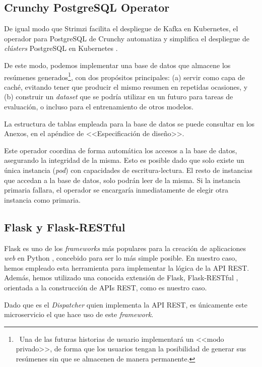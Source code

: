 \subsection{Crunchy PostgreSQL Operator}

De igual modo que Strimzi facilita el despliegue de Kafka en Kubernetes, el operador para PostgreSQL de Crunchy automatiza y simplifica el despliegue de \emph{clústers} PostgreSQL en Kubernetes \cite{crunchy21}.

De este modo, podemos implementar una base de datos que almacene los resúmenes generados\footnote{\, Una de las futuras historias de usuario implementará un <<modo privado>>, de forma que los usuarios tengan la posibilidad de generar sus resúmenes sin que se almacenen de manera permanente.}, con dos propósitos principales: (a) servir como capa de caché, evitando tener que producir el mismo resumen en repetidas ocasiones, y (b) construir un \emph{dataset} que se podría utilizar en un futuro para tareas de evaluación, o incluso para el entrenamiento de otros modelos.

La estructura de tablas empleada para la base de datos se puede consultar en los Anexos, en el apéndice de <<Especificación de diseño>>.

Este operador coordina de forma automática los accesos a la base de datos, asegurando la integridad de la misma. Esto es posible dado que solo existe un única instancia (\emph{pod}) con capacidades de escritura-lectura. El resto de instancias que accedan a la base de datos, solo podrán leer de la misma. Si la instancia primaria fallara, el operador se encargaría inmediatamente de elegir otra instancia como primaria.


\subsection{Flask y Flask-RESTful}

Flask es uno de los \emph{frameworks} más populares para la creación de aplicaciones \emph{web} en Python \cite{flask}, concebido para ser lo más simple posible. En nuestro caso, hemos empleado esta herramienta para implementar la lógica de la API REST. Además, hemos utilizado una conocida extensión de Flask, Flask-RESTful \cite{flaskRestful}, orientada a la construcción de APIs REST, como es nuestro caso.

Dado que es el \emph{Dispatcher} quien implementa la API REST, es únicamente este microservicio el que hace uso de este \emph{framework}.


